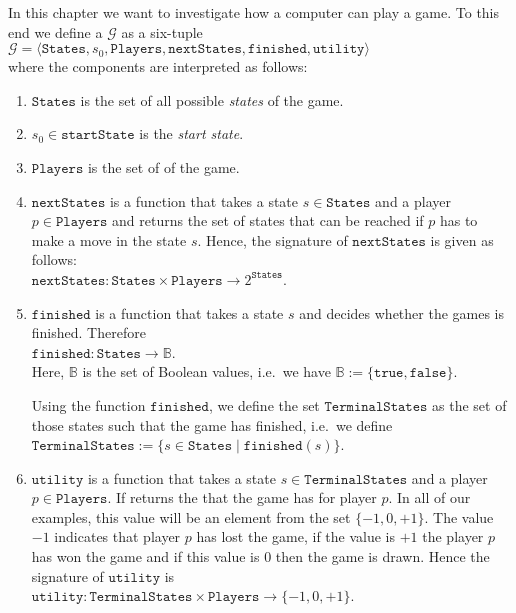 In this chapter we want to investigate how a computer can play a game.  To this end we define a
 $\mathcal{G}$ as a six-tuple
\\[0.2cm]
\hspace*{1.3cm}
$\mathcal{G} = \langle \texttt{States}, s_0, \texttt{Players}, \texttt{nextStates}, \texttt{finished},\texttt{utility} \rangle$
\\[0.2cm]
where the components are interpreted as follows:
\begin{enumerate}
\item $\texttt{States}$ is the set of all possible \emph{\color{blue}states} of the game.
\item $s_0 \in \texttt{startState}$ is the \emph{\color{blue}start state}.
\item $\texttt{Players}$ is  the set of  of the game.
\item $\texttt{nextStates}$ is a function that takes a state $s \in \texttt{States}$ and a player $p \in \texttt{Players}$ and returns the set of
      states that can be reached if $p$ has to make a move in the state $s$.  Hence, the signature of
      $\texttt{nextStates}$ is given as follows:
      \\[0.2cm]
      \hspace*{1.3cm}
      $\texttt{nextStates}: \texttt{States} \times \texttt{Players} \rightarrow 2^{\texttt{States}}$.
\item $\texttt{finished}$ is a function that takes a state $s$ and decides whether the games is finished.
      Therefore
      \\[0.2cm]
      \hspace*{1.3cm}
      $\texttt{finished}: \texttt{States} \rightarrow \mathbb{B}$.
      \\[0.2cm]
      Here, $\mathbb{B}$ is the set of Boolean values, i.e.~we have $\mathbb{B} := \{ \texttt{true}, \texttt{false} \}$.
  
      Using the function $\texttt{finished}$, we define the set $\texttt{TerminalStates}$ as the set of those
      states such that the game has finished,  i.e.~we define
      \\[0.2cm]
      \hspace*{1.3cm}
      $\texttt{TerminalStates} := \{ s \in \texttt{States} \mid \texttt{finished}(s) \}$.
\item $\texttt{utility}$ is a function that takes a state $s \in \texttt{TerminalStates}$ and a player $p \in \texttt{Players}$.  If returns
      the  that the game has for player $p$.  In all of our examples, this value will be an element
      from the set $\{-1, 0, +1\}$.  The value $-1$ indicates that player $p$ has lost the game,
      if the value is $+1$ the player $p$ has won the game and if this value is $0$ then the game is drawn.
      Hence the signature of $\texttt{utility}$ is
      \\[0.2cm]
      \hspace*{1.3cm}
      $\texttt{utility}: \texttt{TerminalStates} \times \texttt{Players} \rightarrow \{ -1, 0, +1\}$.
\end{enumerate}

